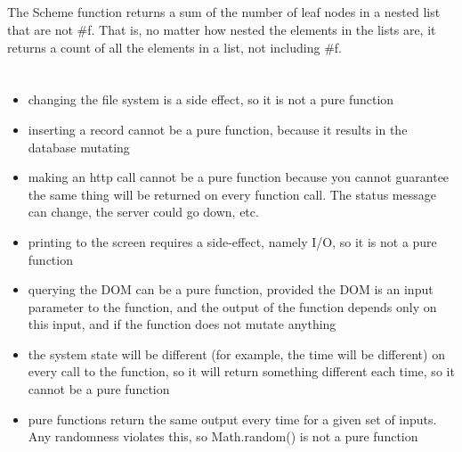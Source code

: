 \documentclass[letterpaper]{article}
\begin{document}
\section{}
\inputminted[]{rust}{8.rs}

\section{}
The Scheme function returns a sum of the number of leaf nodes in a nested list
that are not \#f. That is, no matter how nested the elements in the lists are,
it returns a count of all the elements in a list, not including \#f.
%




\section{}
\begin{itemize}
  \item changing the file system is a side effect, so it is not a pure function
  \item inserting a record cannot be a pure function, because it results in the
    database mutating
  \item making an http call cannot be a pure function because you cannot
    guarantee the same thing will be returned on every function call. The status
    message can change, the server could go down, etc.
  \item printing to the screen requires a side-effect, namely I/O, so it is not
    a pure function
  \item querying the DOM can be a pure function, provided the DOM is an input
    parameter to the function, and the output of the function depends only on
    this input, and if the function does not mutate anything
  \item the system state will be different (for example, the time will be
    different) on every call to the function, so it
    will return something different each time, so it cannot be a pure function
  \item pure functions return the same output every time for a given set of
    inputs. Any randomness violates this, so Math.random() is not a pure
    function
\end{itemize}
\end{document}

